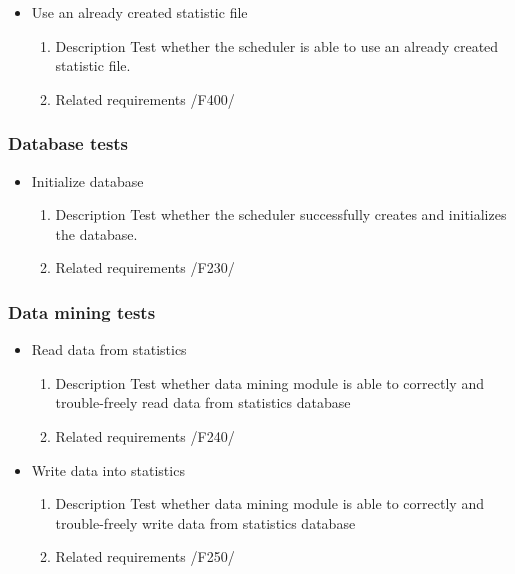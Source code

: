 {\begin{itemize}
			
			
				\item Use an already created statistic file
				\begin{enumerate}
					\item Description\newline
Test whether the scheduler is able to use an already created statistic file.
					\item Related requirements\newline
						/F400/
				\end{enumerate}
								
			\end{itemize}
		
		\subsubsection{Database tests}
			\begin{itemize}
				
		
				\item Initialize database
				\begin{enumerate}
					\item Description\newline
Test whether the scheduler successfully creates and initializes the database.
					\item Related requirements\newline
					/F230/
				\end{enumerate}
			\end{itemize}
		
		\subsubsection{Data mining tests}
			\begin{itemize}
			
				\item Read data from statistics
				\begin{enumerate}
					\item Description\newline
Test whether data mining module is able to correctly and trouble-freely read data from statistics database
					\item Related requirements\newline
					/F240/
				\end{enumerate}
				
				\item Write data into statistics
				\begin{enumerate}
					\item Description\newline
Test whether data mining module is able to correctly and trouble-freely write data from statistics database
					\item Related requirements\newline
					/F250/
				\end{enumerate}
				

\end{itemize}}
